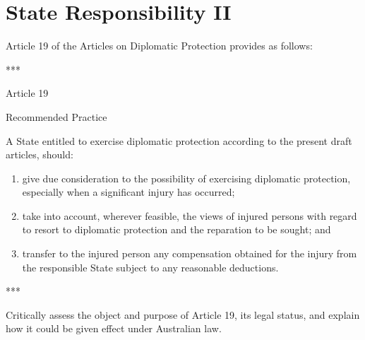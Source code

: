 \section{State Responsibility II}
\begin{tutorialquestion}
    \flushleft
    Article 19 of the Articles on Diplomatic Protection provides as follows:

    \begin{center}
        *** \\

        \vspace{\baselineskip}

        Article 19

        \vspace{\baselineskip}

        Recommended Practice
    \end{center}
    
    \vspace{\baselineskip}

    A State entitled to exercise diplomatic protection according to the present draft articles, should:
    \begin{enumerate}[label=(\alph*)]
        \item give due consideration to the possibility of exercising diplomatic protection, especially when a significant injury has occurred;
        \item take into account, wherever feasible, the views of injured persons with regard to resort to diplomatic protection and the reparation to be sought; and
        \item transfer to the injured person any compensation obtained for the injury from the responsible State subject to any reasonable deductions.
    \end{enumerate}
    \centerline{***}

    \vspace{\baselineskip}
    
    Critically assess the object and purpose of Article 19, its legal status, and explain how it could be given effect under Australian law.
\end{tutorialquestion}


